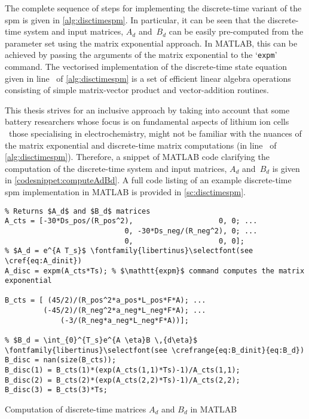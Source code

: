 The complete sequence of steps for implementing the discrete-time variant of the
\gls{spm} is given in \cref{alg:disctimespm}. In particular, it can be seen that
the  discrete-time system  and input  matrices,  $A_d$ and~$B_d$  can be  easily
pre-computed from  the parameter set  using the matrix exponential  approach. In
\textsc{MATLAB}, this  can be achieved  by passing  the arguments of  the matrix
exponential to the  `\verb+expm+' command. The vectorised  implementation of the
discrete-time  state equation  given in  line~\nolink{\ref{algLine:discstateEq}}
of  \cref{alg:disctimespm}  is a  set  of  efficient linear  algebra  operations
consisting of simple matrix-vector product and vector-addition routines.



This thesis strives  for an inclusive approach by taking  into account that some
battery researchers whose  focus is on fundamental aspects of  lithium ion cells
\eg~those  specialising in  electrochemistry,  might not  be  familiar with  the
nuances  of the  matrix exponential  and discrete-time  matrix computations  (in
line~\nolink{\ref{algLine:computeAdBd}}  of \cref{alg:disctimespm}).  Therefore,
a  snippet   of  \textsc{MATLAB}   code  clarifying   the  computation   of  the
discrete-time   system   and   input   matrices,  $A_d$   and~$B_d$   is   given
in   \cref{codesnippet:computeAdBd}.  A   full  code   listing  of   an  example
discrete-time  \gls{spm}  implementation  in   \textsc{MATLAB}  is  provided  in
\cref{sc:disctimespm}.

\begin{listing}[!htbp]
\begin{verbatim}
% Returns $A_d$ and $B_d$ matrices
A_cts = [-30*Ds_pos/(R_pos^2),                    0, 0; ...
                            0, -30*Ds_neg/(R_neg^2), 0; ...
                            0,                    0, 0];
% $A_d = e^{A T_s}$ \fontfamily{libertinus}\selectfont(see \cref{eq:A_dinit})
A_disc = expm(A_cts*Ts); % $\mathtt{expm}$ command computes the matrix exponential

B_cts = [ (45/2)/(R_pos^2*a_pos*L_pos*F*A); ...
         (-45/2)/(R_neg^2*a_neg*L_neg*F*A); ...
             (-3/(R_neg*a_neg*L_neg*F*A))];

% $B_d = \int_{0}^{T_s}e^{A \eta}B \,{d\eta}$ \fontfamily{libertinus}\selectfont(see \crefrange{eq:B_dinit}{eq:B_d})
B_disc = nan(size(B_cts));
B_disc(1) = B_cts(1)*(exp(A_cts(1,1)*Ts)-1)/A_cts(1,1);
B_disc(2) = B_cts(2)*(exp(A_cts(2,2)*Ts)-1)/A_cts(2,2);
B_disc(3) = B_cts(3)*Ts;
\end{verbatim}
\caption{Computation of discrete-time matrices $A_d$ and $B_d$ in
\textsc{MATLAB}}
\label{codesnippet:computeAdBd}
\end{listing}

